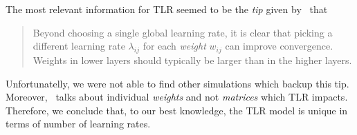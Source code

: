The most relevant information for TLR seemed to be the \emph{tip} given by~\citet{lecun2012efficient} that \blockquote{Beyond choosing a single global learning rate, it is clear that picking a different learning rate $\lambda_{ij}$ for each \emph{weight} $w_{ij}$ can improve convergence. Weights in lower layers should typically be larger than in the higher layers.} Unfortunatelly, we were not able to find other simulations which backup this tip. Moreover,~\citet{lecun2012efficient} talks about individual \emph{weights} and not \emph{matrices} which TLR impacts. Therefore, we conclude that, to our best knowledge, the TLR model is unique in terms of number of learning rates. 

